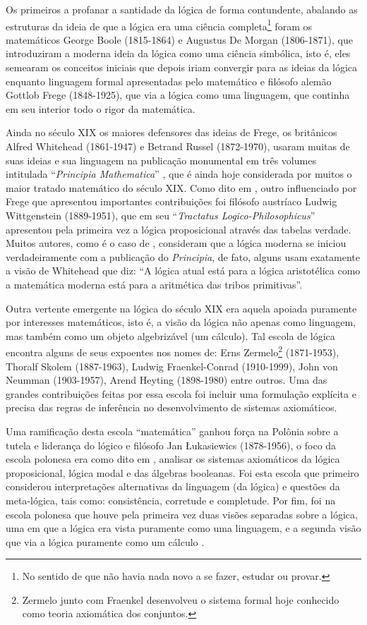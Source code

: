 Os primeiros a profanar a santidade da lógica de forma contundente, abalando as estruturas da ideia de que a lógica era uma ciência completa\footnote{No sentido de que não havia nada novo a se fazer, estudar ou provar.} foram os matemáticos George Boole (1815-1864) e Augustus De Morgan (1806-1871), que introduziram a moderna ideia da lógica como uma ciência simbólica, isto é, eles semearam os conceitos iniciais que depois iriam convergir para as ideias da lógica enquanto linguagem formal apresentadas pelo matemático e filósofo alemão Gottlob Frege (1848-1925), que via a lógica como uma linguagem, que continha em seu interior todo o rigor da matemática.

Ainda no século XIX os maiores defensores das ideias de Frege, os britânicos Alfred Whitehead (1861-1947) e Betrand Russel (1872-1970), usaram muitas de suas ideias e sua linguagem na publicação monumental em três volumes intitulada ``\textit{Principia Mathematica}'' \cite{russel1910principia}, que é ainda hoje considerada por muitos o maior tratado matemático do século XIX. Como dito em \cite{benja-Logica}, outro influenciado por Frege que apresentou importantes contribuições foi filósofo austríaco Ludwig Wittgenstein (1889-1951), que em seu ``\textit{Tractatus Logico-Philosophicus}'' apresentou pela primeira vez a lógica proposicional através das tabelas verdade. Muitos autores, como é o caso de \cite{abe2002-logica}, consideram que a lógica moderna se iniciou verdadeiramente com a publicação do \textit{Principia}, de fato, alguns usam exatamente a visão de Whitehead que diz: ``A lógica atual está para a lógica aristotélica como a matemática moderna está para a aritmética das tribos primitivas''.

Outra vertente emergente na lógica do século XIX era aquela apoiada puramente por interesses matemáticos, isto é, a visão da lógica não apenas como linguagem, mas também como um objeto algebrizável (um cálculo). Tal escola de lógica encontra alguns de seus expoentes nos nomes de: Erns Zermelo\footnote{Zermelo junto com Fraenkel desenvolveu o sistema formal hoje conhecido como teoria axiomática dos conjuntos.} (1871-1953), Thoralf Skolem (1887-1963), Ludwig Fraenkel-Conrad (1910-1999), John von Neumman (1903-1957), Arend Heyting (1898-1980) entre outros. Uma das grandes contribuições feitas por essa escola foi incluir uma formulação explícita e precisa das regras de inferência no desenvolvimento de sistemas axiomáticos.

Uma ramificação desta escola ``matemática'' ganhou força na Polônia sobre a tutela e liderança do lógico e filósofo Jan \L{}ukasiewics (1878-1956), o foco da escola polonesa era como dito em \cite{benja-Logica}, analisar os sistemas axiomáticos da lógica proposicional, lógica modal e das álgebras booleanas. Foi esta escola que primeiro considerou interpretações alternativas da linguagem (da lógica) e questões da meta-lógica, tais como: consistência, corretude e completude. Por fim, foi na escola polonesa que houve pela primeira vez duas visões separadas sobre a lógica, uma em que a lógica era vista puramente como uma linguagem, e a segunda visão que via a lógica puramente como um cálculo \cite{benja-Logica}.

